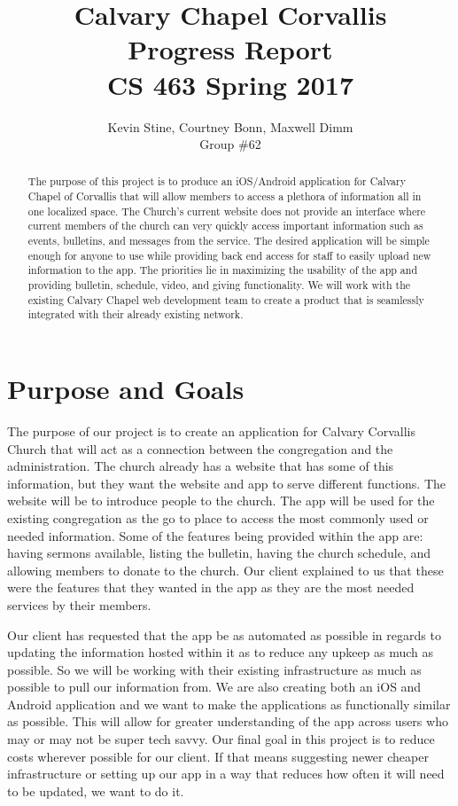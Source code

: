 \documentclass[letterpaper,10pt,draftclsnofoot,onecolumn,titlepage]{IEEEtran}
\def\name{Kevin Stine, Courtney Bonn, Maxwell Dimm}
\def\team{Calvary Chapel Corvallis}
\def\grp{Group \#62}
\begin{document}
	\title{\huge \team \\ Progress Report\\ CS 463 Spring 2017}
	\author{\large \name \\ \grp}



	\maketitle

		\begin{abstract}The purpose of this project is to produce an iOS/Android application for Calvary Chapel of Corvallis that will allow members to access a plethora of information all in one localized space.
		The Church's current website does not provide an interface where current members of the church can very quickly access important information such as events, bulletins, and messages from the service.
		The desired application will be simple enough for anyone to use while providing back end access for staff to easily upload new information to the app.
		The priorities lie in maximizing the usability of the app and providing bulletin, schedule, video, and giving functionality.
		We will work with the existing Calvary Chapel web development team to create a product that is seamlessly integrated with their already existing network.
		\end{abstract}

		\clearpage

\section{Purpose and Goals}
		The purpose of our project is to create an application for Calvary Corvallis Church that will act as a connection between the congregation and the administration.
		The church already has a website that has some of this information, but they want the website and app to serve different functions.
		The website will be to introduce people to the church.
		The app will be used for the existing congregation as the go to place to access the most commonly used or needed information.
		Some of the features being provided within the app are: having sermons available, listing the bulletin, having the church schedule, and allowing members to donate to the church.
		Our client explained to us that these were the features that they wanted in the app as they are the most needed services by their members.

		Our client has requested that the app be as automated as possible in regards to updating the information hosted within it as to reduce any upkeep as much as possible.
		So we will be working with their existing infrastructure as much as possible to pull our information from.
		We are also creating both an iOS and Android application and we want to make the applications as functionally similar as possible.
		This will allow for greater understanding of the app across users who may or may not be super tech savvy.
		Our final goal in this project is to reduce costs wherever possible for our client.
		If that means suggesting newer cheaper infrastructure or setting up our app in a way that reduces how often it will need to be updated, we want to do it.
\end{document}
